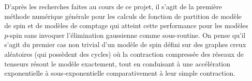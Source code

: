 D'après les recherches faites au cours de ce projet, il s'agit de la première méthode numérique générale pour les calculs de fonction de partition de modèle de spin et de modèles de comptage qui atteint cette performance pour les modèles $p$-spin sans invoquer l'élimination gaussienne comme sous-routine.
On pense qu'il s'agit du premier cas non trivial d'un modèle de spin défini sur des graphes creux aléatoires (qui possèdent des cycles) où la contraction compressée des réseaux de tenseurs résout le modèle exactement, tout en conduisant à une accélération exponentielle à sous-exponentielle comparativement à leur simple contraction.
